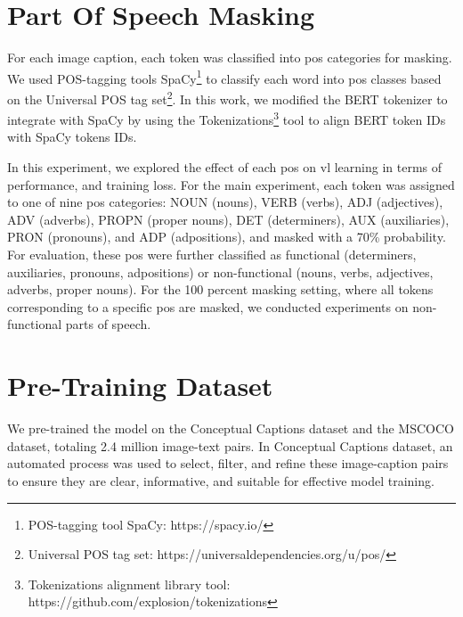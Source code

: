 \section{Part Of Speech Masking}
For each image caption, each token was classified into \acrshort{pos} categories for masking.  
We used POS-tagging tools SpaCy\footnote{POS-tagging tool SpaCy: https://spacy.io/} to classify each word into \acrshort{pos} classes based on the Universal POS tag set\footnote{Universal POS tag set: https://universaldependencies.org/u/pos/}.
In this work, we modified the BERT tokenizer to integrate with SpaCy by using the Tokenizations\footnote{Tokenizations alignment library tool: https://github.com/explosion/tokenizations} tool to align BERT token IDs with SpaCy tokens IDs.

In this experiment, we explored the effect of each \acrshort{pos} on \acrshort{vl} learning in terms of performance, and training loss.  
For the main experiment, each token was assigned to one of nine \acrshort{pos} categories: NOUN (nouns), VERB (verbs), ADJ (adjectives), ADV (adverbs), PROPN (proper nouns), DET (determiners), AUX (auxiliaries), PRON (pronouns), and ADP (adpositions), and masked with a 70\% probability.
For evaluation, these \acrshort{pos} were further classified as functional (determiners, auxiliaries, pronouns, adpositions) or non-functional (nouns, verbs, adjectives, adverbs, proper nouns).
For the 100 percent masking setting, where all tokens corresponding to a specific \acrshort{pos} are masked, we conducted experiments on non-functional parts of speech.

\section{Pre-Training Dataset}
We pre-trained the model on the Conceptual Captions dataset \cite{conceptual-caption} and the MSCOCO dataset, totaling 2.4 million image-text pairs.
In Conceptual Captions dataset, an automated process was used to select, filter, and refine these image-caption pairs to ensure they are clear, informative, and suitable for effective model training.


